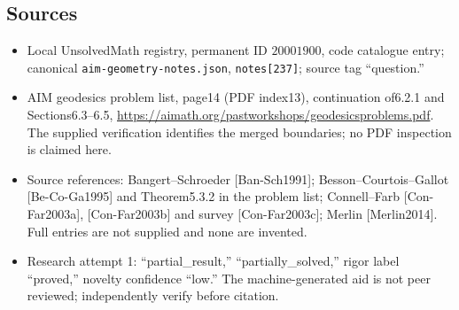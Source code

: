 \documentclass[11pt]{article}
\begin{document}
\subsection{Sources}
\begin{itemize}
\item Local UnsolvedMath registry, permanent ID \(20001900\), code catalogue entry; canonical \texttt{aim-geometry-notes.json}, \texttt{notes[237]}; source tag ``question.''
\item AIM geodesics problem list, page14 (PDF index13), continuation of6.2.1 and Sections6.3--6.5, \url{https://aimath.org/pastworkshops/geodesicsproblems.pdf}. The supplied verification identifies the merged boundaries; no PDF inspection is claimed here.
\item Source references: Bangert--Schroeder [Ban-Sch1991]; Besson--Courtois--Gallot [Be-Co-Ga1995] and Theorem5.3.2 in the problem list; Connell--Farb [Con-Far2003a], [Con-Far2003b] and survey [Con-Far2003c]; Merlin [Merlin2014]. Full entries are not supplied and none are invented.
\item Research attempt 1: ``partial\_result,'' ``partially\_solved,'' rigor label ``proved,'' novelty confidence ``low.'' The machine-generated aid is not peer reviewed; independently verify before citation.
\end{itemize}
\end{document}

